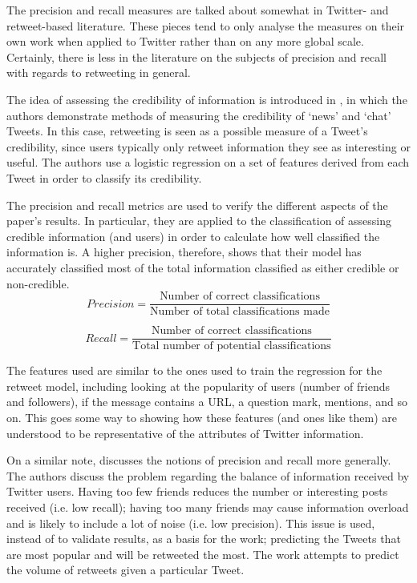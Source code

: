 The precision and recall measures are talked about somewhat in Twitter- and retweet-based literature. These pieces tend to only analyse the measures on their own work when applied to Twitter rather than on any more global scale. Certainly, there is less in the literature on the subjects of precision and recall with regards to retweeting in general.

The idea of assessing the credibility of information is introduced in \cite{castillo11}, in which the authors demonstrate methods of measuring the credibility of `news' and `chat' Tweets. In this case, retweeting is seen as a possible measure of a Tweet's credibility, since users typically only retweet information they see as interesting or useful. The authors use a logistic regression on a set of features derived from each Tweet in order to classify its credibility. 

The precision and recall metrics are used to verify the different aspects of the paper's results. In particular, they are applied to the classification of assessing credible information (and users) in order to calculate how well classified the information is. A higher precision, therefore, shows that their model has accurately classified most of the total information classified as either credible or non-credible.
\[	
	Precision = \frac{\text{Number of correct classifications}}{\text{Number of total classifications made}}
\]

\[
	Recall = \frac{\text{Number of correct classifications}}{\text{Total number of potential classifications}}
\]

The features used are similar to the ones used to train the regression for the retweet model, including looking at the popularity of users (number of friends and followers), if the message contains a URL, a question mark, mentions, and so on. This goes some way to showing how these features (and ones like them) are understood to be representative of the attributes of Twitter information.

On a similar note, \cite{hong11} discusses the notions of precision and recall more generally. The authors discuss the problem regarding the balance of information received by Twitter users. Having too few friends reduces the number or interesting posts received (i.e. low recall); having too many friends may cause information overload and is likely to include a lot of noise (i.e. low precision). This issue is used, instead of to validate results,  as a basis for the work; predicting the Tweets that are most popular and will be retweeted the most. The work attempts to predict the volume of retweets given a particular Tweet.


